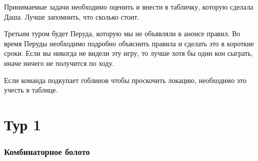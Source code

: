 \documentclass[a4paper,12pt]{article}
\begin{document}
Принимаемые задачи необходимо оценить и внести в табличку, которую сделала Даша. Лучше запомнить, что сколько стоит.

Третьим туром будет Перуда, которую мы не объявляли в анонсе правил. Во время Перуды необходимо подробно объяснить правила и сделать это в короткие сроки. Если вы никогда не видели эту игру, то лучше хотя бы один кон сыграть, иначе ничего не получится по ходу.

Если команда подкупает гоблинов чтобы проскочить локацию, необходимо это учесть в таблице.
\newpage
\part*{Тур 1}




\section{Комбинаторное болото} %
\end{document}
